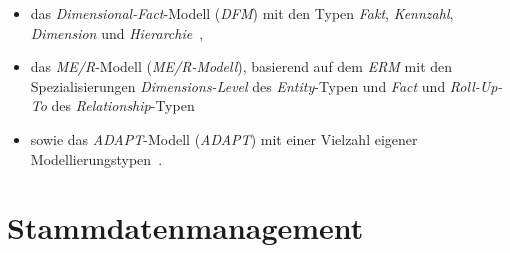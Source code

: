 \documentclass[
  language=german, %
  type=bachelor,%
  ngerman
]{isthesis}
\begin{document}
\begin{content}
  \begin{itemize}
    \item das \textit{Dimensional-Fact}-Modell (\textit{\acrshort{DFM}}) mit den Typen
      \textit{Fakt}, \textit{Kennzahl}, \textit{Dimension} und
      \textit{Hierarchie}~\cite[][]{golfarelli1998dimensional}, 
    \item das \textit{\acrlong{ME/R}}-Modell (\textit{\acrshort{ME/R}-Modell}), basierend
      auf dem \textit{\acrlong{ERM}} mit den Spezialisierungen
      \textit{Dimensions-Level} des \textit{Entity}-Typen und \textit{Fact} und
      \textit{Roll-Up-To} des
      \textit{Relationship}-Typen~\cite[][]{sapia1998extending}
    \item sowie das
      \textit{\acrlong{ADAPT}}-Modell (\textit{\acrshort{ADAPT}}) mit einer
      Vielzahl eigener Modellierungstypen~\cite[][]{chamoni2013analytische}.
  \end{itemize}




  \section{Stammdatenmanagement}\label{sec:stammdatenmanagement}


\end{content}
\end{document}
